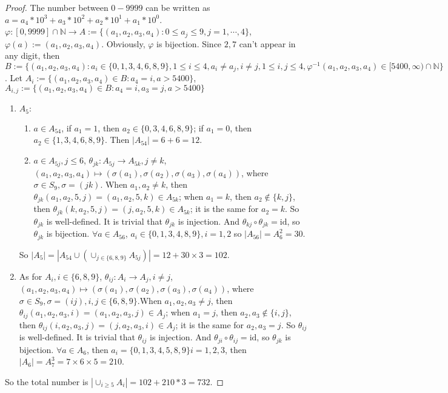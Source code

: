 \documentclass{ctexart}
\newcommand\N{\mathbb {N}}
\renewcommand\phi{\varphi}
\renewcommand{\(}{\left(}
\renewcommand{\)}{\right)}
\newcommand{\id}{\mathrm{id}}
\begin{document}
\begin{proof}
The number between $0-9999$ can be written as $a = a_4*10^3+a_3*10^2+a_2*10^1+a_1*10^0$. $\phi: [0,9999]\cap \N\to A:=\{(a_1,a_2,a_3,a_4):0\leq a_j\leq 9, j=1,\cdots, 4\}$,  $\phi(a):=(a_1,a_2,a_3,a_4)$. Obviously, $\phi$ is bijection.
Since $2,7$ can't appear in any digit, then $
B:=\{(a_1,a_2,a_3,a_4) : a_i\in\{0,1,3,4,6,8,9\}, 1\leq i\leq 4, a_i \neq a_j, i\neq j, 1\leq i,j\leq 4, \phi^{-1}(a_1,a_2,a_3,a_4)\in[5400,\infty)\cap\N\}$. Let $A_i:=\{(a_1,a_2,a_3,a_4)\in B: a_4=i, a>5400\}$, $A_{i,j}:=\{(a_1,a_2,a_3,a_4)\in B:a_4=i, a_3=j, a>5400 \}$
\begin{enumerate}
\item  $A_{5}:$
\begin{enumerate}
\item $a\in A_{54}$, if $a_1=1$, then $a_2\in\{0,3,4,6,8,9\}$; if $a_1=0$, then $a_2\in\{1,3,4,6,8,9\}$. Then $|A_{54}|=6+6=12$.
\item $a\in A_{5j}, j\leq6$,
$\theta_{jk}: A_{5j}\to A_{5k},j\neq k$, $(a_1,a_2,a_3,a_4)\mapsto(\sigma(a_1),\sigma(a_2),\sigma(a_3),\sigma(a_4))$, where $\sigma\in S_9, \sigma=(j k)$.
When $a_1,a_2\neq k$, then $\theta_{jk}(a_1,a_2,5,j)=(a_1,a_2,5,k)\in A_{5k}$; when $a_1= k$, then $a_2\notin\{k,j\}$, then $\theta_{jk}(k,a_2,5,j)=(j,a_2,5,k)\in A_{5k}$; it is the same for $a_2=k$. So $\theta_{jk}$ is well-defined. It is trivial that $\theta_{jk}$ is injection. And $\theta_{kj}\circ \theta_{jk}=\id$, so $\theta_{jk}$ is bijection. $\forall a \in A_{56}$, $a_i\in\{0,1,3,4,8,9\}, i=1,2$ so $|A_{56}|=A_{6}^{2}=30$.
\end{enumerate}
So $|A_{5}|=|A_{54}\cup(\cup_{j\in\{6,8,9\}}A_{5j})|=12+30\times 3=102$.
\item As for $A_{i}, i\in\{6,8,9\}$, $\theta_{ij}: A_{i}\to A_{j},i\neq j$, $(a_1,a_2,a_3,a_4)\mapsto(\sigma(a_1),\sigma(a_2),\sigma(a_3),\sigma(a_4))$, where $\sigma\in S_9, \sigma=(i j),  i,j\in\{6,8,9\}$.When $a_1,a_2,a_3\neq j$, then $\theta_{ij}(a_1,a_2,a_3,i)=(a_1,a_2,a_3,j)\in A_{j}$; when $a_1= j$, then $a_2,a_3\notin\{i,j\}$, then $\theta_{ij}(i,a_2,a_3,j)=(j,a_2,a_3,i)\in A_{j}$; it is the same for $a_2,a_3=j$. So $\theta_{ij}$ is well-defined. It is trivial that $\theta_{ij}$ is injection. And $\theta_{ji}\circ \theta_{ij}=\id$, so $\theta_{jk}$ is bijection. $\forall a\in A_{6}$, then $a_i=\{0,1,3,4,5,8,9\} i=1,2,3$, then $|A_6|=A_{7}^{3}=7\times 6\times 5=210$.
\end{enumerate}
So the total number is $|\cup_{i\geq5}A_i|=102+210*3=732$.
\end{proof}
\end{document}
